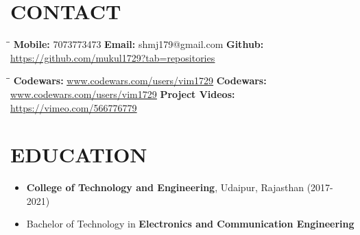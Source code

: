 \documentclass{res}[12pt]
\begin{document}
 


                                  
\begin{resume}
	\section{\large{CONTACT}}
   \vspace{-0.2cm}	
   \begin{tabbing}
   \hspace{1.5in}\= \hspace{1.9in}\= \kill %
	   {\textbf{Mobile: }} 7073773473 
	   \>\textbf{Email: } shmj179@gmail.com    
	   \vspace{-0.2cm}	
	   \>\textbf{Github: } \uline{\url{https://github.com/mukul1729?tab=repositories}}\\
	\end{tabbing}
			
   \vspace{-0.5in}	
   \begin{tabbing}
   \hspace{3.4in}\= \hspace{1.8in}\= \kill %
	   {\textbf{Codewars: }} \uline{\url{www.codewars.com/users/vim1729}}
	   {\textbf{Codewars: }} \uline{\url{www.codewars.com/users/vim1729}}
	   \>\textbf{Project Videos: } \uline{\url{https://vimeo.com/566776779}}
	\end{tabbing}
\vspace{-0.1in}

\section{\large{EDUCATION}}          
	\begin{itemize}
		\item \textbf{College of Technology and Engineering}, Udaipur, Rajasthan
				(2017-2021)
		\item Bachelor of Technology in \textbf{Electronics and Communication Engineering}
	\end{itemize}
\vspace{-0.2in}


\end{resume}
\end{document}
